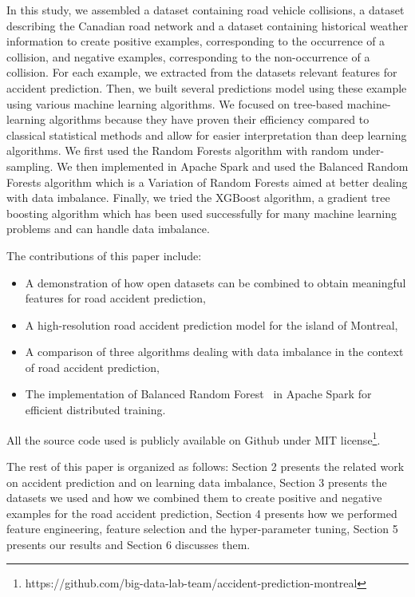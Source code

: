 \documentclass[conference]{IEEEtran}
\begin{document}
In this study, we assembled a dataset containing road vehicle collisions, a dataset describing the Canadian road network and a dataset containing historical weather information to create positive examples, corresponding to the occurrence of a collision, and negative examples, corresponding to the non-occurrence of a collision. For each example, we extracted from the datasets relevant features for accident prediction. Then, we built several predictions model using these example using various machine learning algorithms. We focused on tree-based machine-learning algorithms because they have proven their efficiency compared to classical statistical methods \cite{Chang2005, Chang2005b} and allow for easier interpretation than deep learning algorithms. We first used the Random Forests algorithm with random under-sampling. We then implemented in Apache Spark and used the Balanced Random Forests algorithm\cite{Chen2004} which is a Variation of Random Forests aimed at better dealing with data imbalance. Finally, we  tried the XGBoost algorithm, a gradient tree boosting algorithm which has been used successfully for many machine learning problems and can handle data imbalance\cite{xgboost_doc}.

The contributions of this paper include: 
\begin{itemize}
\item A demonstration of how open datasets can be combined to obtain
meaningful features for road accident prediction,
\item A high-resolution road accident prediction model for the island of Montreal,
\item A comparison of three algorithms dealing with data imbalance in the context of road accident prediction,
\item The implementation of Balanced Random Forest~\cite{Chen2004} in Apache Spark for efficient distributed training.
\end{itemize}

All the source code used is publicly available on Github under MIT
license\footnote{https://github.com/big-data-lab-team/accident-prediction-montreal}.

The rest of this paper is organized as follows: Section 2 presents
the related work on accident prediction and on learning data imbalance, Section 3 presents the datasets we used and
how we combined them to create positive and negative examples for the road
accident prediction, Section 4 presents how we performed feature
engineering, feature selection and the hyper-parameter tuning, Section 5
presents our results and Section 6 discusses them.
\end{document}
